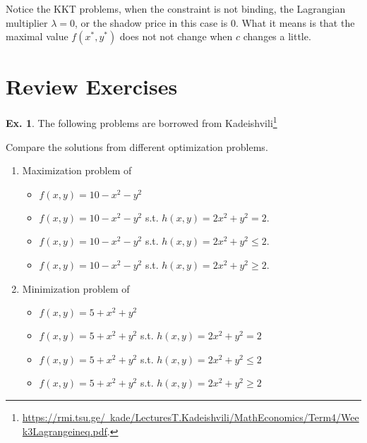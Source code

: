 \documentclass[10pt,a4paper]{book}
\theoremstyle{definition}\newtheorem{definition}{Definition}
\theoremstyle{definition}\newtheorem{fact}{Fact}
\theoremstyle{definition}\newtheorem{ex}{Ex.}
\theoremstyle{definition}\newtheorem{project}{Project}
\theoremstyle{definition}\newtheorem{problem}{Problem}
\theoremstyle{definition}\newtheorem{example}{Example}
\numberwithin{theorem}{chapter}
\numberwithin{corollary}{chapter}
\numberwithin{assumption}{chapter}
\numberwithin{definition}{chapter}
\numberwithin{prop}{chapter}
\numberwithin{notation}{chapter}
\numberwithin{problem}{chapter}
\numberwithin{example}{chapter}
\numberwithin{fact}{chapter}
\numberwithin{ex}{chapter}
\begin{document}
	Notice the KKT problems, when the constraint is not binding, the Lagrangian multiplier $\lambda = 0$, or the shadow price in this case is 0. What it means is that the maximal value $f(x^*,y^*)$ does not not change when $c$ changes a little.
	
	\section{Review Exercises}
	
	\begin{ex}
		The following problems are borrowed from Kadeishvili\footnote{\href{https://rmi.tsu.ge/~kade/LecturesT.Kadeishvili/MathEconomics/Term4/Week3Lagrangeineq.pdf}{https://rmi.tsu.ge/~kade/LecturesT.Kadeishvili/MathEconomics/Term4/Week3Lagrangeineq.pdf}.}
		
		Compare the solutions from different optimization problems.
		
		\begin{enumerate}
			\item Maximization problem of
			\begin{itemize}
				\item $f(x,y) = 10 - x^2 - y^2$
				\item $f(x,y) = 10 - x^2 - y^2$ s.t. $h(x,y) = 2 x^2 + y^2 = 2$.
				\item $f(x,y) = 10 - x^2 - y^2$ s.t. $h(x,y) = 2 x^2 + y^2 \leq 2$.
				\item $f(x,y) = 10 - x^2 - y^2$ s.t. $h(x,y) = 2 x^2 + y^2 \geq 2$.
			\end{itemize}
			\item Minimization problem of
			\begin{itemize}
				\item $f(x,y) = 5 + x^2 + y^2$
				\item $f(x,y) = 5 + x^2 + y^2$ s.t. $h(x,y) = 2 x^2 + y^2 = 2$
				\item $f(x,y) = 5 + x^2 + y^2$ s.t. $h(x,y) = 2 x^2 + y^2 \leq 2$
				\item $f(x,y) = 5 + x^2 + y^2$ s.t. $h(x,y) = 2 x^2 + y^2 \geq 2$
			\end{itemize}
		\end{enumerate}
	\end{ex}
	
\end{document}
